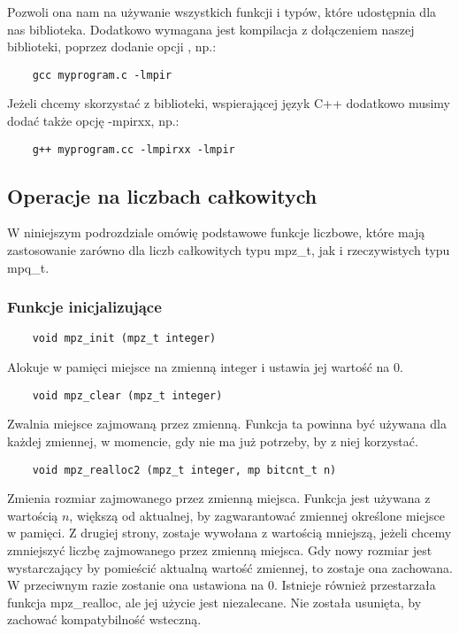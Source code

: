 \documentclass[oneside,a4paper]{book}
\begin{document}
	Pozwoli ona nam na używanie wszystkich funkcji i typów, które udostępnia dla nas biblioteka. Dodatkowo wymagana jest kompilacja z dołączeniem naszej biblioteki, poprzez dodanie opcji , np.:
	\begin{lstlisting}
	gcc myprogram.c -lmpir
	\end{lstlisting}
	
	Jeżeli chcemy skorzystać z biblioteki, wspierającej język C++ dodatkowo musimy dodać także opcję -mpirxx, np.:
	\begin{lstlisting}
	g++ myprogram.cc -lmpirxx -lmpir
	\end{lstlisting}
	
	\subsection{Operacje na liczbach całkowitych}
	W niniejszym podrozdziale omówię podstawowe funkcje liczbowe, które mają zastosowanie zarówno dla liczb całkowitych typu mpz\_t, jak i rzeczywistych typu mpq\_t.
	
	\subsubsection{Funkcje inicjalizujące}
	\begin{lstlisting}
	void mpz_init (mpz_t integer)
	\end{lstlisting}
	
	Alokuje w pamięci miejsce na zmienną integer i ustawia jej wartość na $0$.
	
	\begin{lstlisting}
	void mpz_clear (mpz_t integer)
	\end{lstlisting}
	
	Zwalnia miejsce zajmowaną przez zmienną. Funkcja ta powinna być używana dla każdej zmiennej, w momencie, gdy nie ma już potrzeby, by z niej korzystać.
	
	\begin{lstlisting}
	void mpz_realloc2 (mpz_t integer, mp bitcnt_t n)
	\end{lstlisting}
	
	Zmienia rozmiar zajmowanego przez zmienną miejsca. Funkcja jest używana z wartością $n$, większą od aktualnej, by zagwarantować zmiennej określone miejsce w pamięci. Z drugiej strony, zostaje wywołana z wartością mniejszą, jeżeli chcemy zmniejszyć liczbę zajmowanego przez zmienną miejsca. Gdy nowy rozmiar jest wystarczający by pomieścić aktualną wartość zmiennej, to zostaje ona zachowana. W przeciwnym razie zostanie ona ustawiona na $0$. Istnieje również przestarzała funkcja mpz\_realloc, ale jej użycie jest niezalecane. Nie została usunięta, by zachować kompatybilność wsteczną.
	
\end{document}
